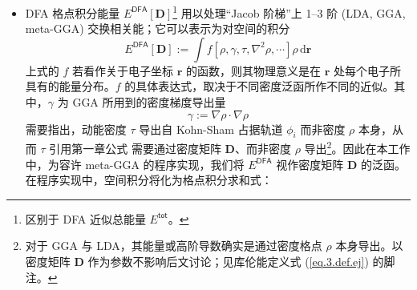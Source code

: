 \begin{itemize}[nosep]
        部分泛函在交换能部分考虑了长短程效应；长程 (LR, \underline{L}ong-\underline{R}ange) 部分能量 $E_\mathrm{x}^\textsf{LR}$ 的双电子除了积分算符通常是 $\mathrm{erf} (\mu r_{12}) / r_{12}$\footnote{$\mu$ 是长程矫正的参数，通常小于 1。对于长程矫正作用，使用误差函数 $\mathrm{erf} (\mu r_{12}) / r_{12}$ 是常见且最多程序实现的方法；但除此之外，Yukawa 衰减算符 $\mathrm{exp} (-\mu r_{12}) / r_{12}$\cite{Savin-Flad.IJQC.1995} 与 $\mathrm{terf}$ 函数 $$\mathrm{terf} (r, r_0) := \frac{1}{2} \left( \mathrm{erf} \left(\frac{r - r_0}{\sqrt{2} r_0}\right) + \mathrm{erf} \left(\frac{r + r_0}{\sqrt{2} r_0}\right) \right)$$ 所构成的衰减算符 $\mathrm{terf} (-\mu r_{12}) / r_{12}$\cite{Goldey-Head-Gordon.PCCP.2013}，也是其它可能使用到的长程矫正方案。}，在计算、程序调用、张量分解等具体的程序实现上等同于严格交换能 $E_\mathrm{x}^\textsf{exact}$\footnote{需要指出，这只是双电子能量积分的一种表达方法。以 Cammi 等\cite{Cammi-Frisch.TCA.2004}对溶剂化模型下 MP2 二阶梯度理论为例，该文将电子效应诱导的溶剂化能量与双电子积分能量合并处理；而溶剂化能量的计算本身是不具有双电子积分。同时，在以较为抽象的层面上推导二阶梯度问题时，DFA 格点积分能量 $E^\textsf{DFA} [\mathbf{D}]$ 与双电子积分有类似的推演过程；因此从梯度理论的角度来讲，拆分双电子积分能量 $E^\textsf{ERI}$ 与 DFA 格点积分能量 $E^\textsf{DFA}$ 是人为的。在本工作中，我们不涉及溶剂化、基于密度的长程弥散矫正等其它无法简单纳入单电子积分能量的贡献；因此从程序实现方便、或计算量差异的角度，拆分了双电子积分能量与 DFA 格点积分能量。}。
  \item DFA 格点积分能量 $E^\textsf{DFA} [\mathbf{D}]$\footnote{区别于 DFA 近似总能量 $E^\textsf{tot}$。} 用以处理“Jacob 阶梯”上 1--3 阶 (LDA, GGA, meta-GGA) 交换相关能；它可以表示为对空间的积分
        \begin{equation}
          E^\textsf{DFA} [\mathbf{D}] := \int f[\rho, \gamma, \tau, \nabla^2 \rho, \cdots] \rho \, \mathrm{d} \bm{r}
        \end{equation}
        上式的 $f$ 若看作关于电子坐标 $\bm{r}$ 的函数，则其物理意义是在 $\bm{r}$ 处每个电子所具有的能量分布。$f$ 的具体表达式，取决于不同密度泛函所作不同的近似。其中，$\gamma$ 为 GGA 所用到的密度梯度导出量
        \begin{equation}
          \gamma := \nabla \rho \cdot \nabla \rho
        \end{equation}
        需要指出，动能密度 $\tau$ 导出自 Kohn-Sham 占据轨道 $\phi_i$ 而非密度 $\rho$ 本身，从而 $\tau$ \alert{引用第一章公式} 需要通过密度矩阵 $\mathbf{D}$、而非密度 $\rho$ 导出\footnote{对于 GGA 与 LDA，其能量或高阶导数确实是通过密度格点 $\rho$ 本身导出。以密度矩阵 $\mathbf{D}$ 作为参数不影响后文讨论；见库伦能定义式 (\ref{eq.3.def.ej}) 的脚注。}。因此在本工作中，为容许 meta-GGA 的程序实现，我们将 $E^\textsf{DFA}$ 视作密度矩阵 $\mathbf{D}$ 的泛函。在程序实现中，空间积分将化为格点积分求和式：

\end{itemize}
